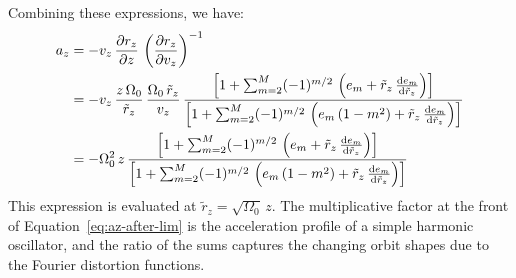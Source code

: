 \documentclass[modern]{aastex631}
\newcommand{\freqzero}{\ensuremath{\Omega_0}}
\newcommand{\mmax}{\ensuremath{M}}
\newcommand{\rz}{\ensuremath{r_z}}
\newcommand{\rzp}{\ensuremath{\tilde{r}_z}}
\begin{document}
Combining these expressions, we have:
\begin{align}
    a_z &=
        -v_z \, \frac{\partial \rz}{\partial z} \,
        \left( \frac{\partial \rz}{\partial v_z} \right)^{-1}\\
    &= -v_z \, \frac{z\,\freqzero}{\rzp} \, \frac{\freqzero \, \rzp}{v_z} \,
        \frac{\left[
            1 + \sum_{m=2}^{\mmax} (-1)^{m/2} \,
                \left(e_m + \rzp \, \deriv{e_m}{\rzp}\right)
        \right]}{\left[
            1 + \sum_{m=2}^{\mmax} (-1)^{m/2} \,
                \left(e_m\,(1 - m^2) + \rzp \, \deriv{e_m}{\rzp}\right)
        \right]} \\
    &= -\freqzero^2 \, z \,
        \frac{\left[
            1 + \sum_{m=2}^{\mmax} (-1)^{m/2} \,
                \left(e_m + \rzp \, \deriv{e_m}{\rzp}\right)
        \right]}{\left[
            1 + \sum_{m=2}^{\mmax} (-1)^{m/2} \,
                \left(e_m\,(1 - m^2) + \rzp \, \deriv{e_m}{\rzp}\right)
        \right]} \label{eq:az-after-lim}
\end{align}
This expression is evaluated at $\rzp = \sqrt{\freqzero} \, z$.
The multiplicative factor at the front of Equation~\ref{eq:az-after-lim} is the
acceleration profile of a simple harmonic oscillator, and the ratio of the sums captures
the changing orbit shapes due to the Fourier distortion functions.


\end{document}
